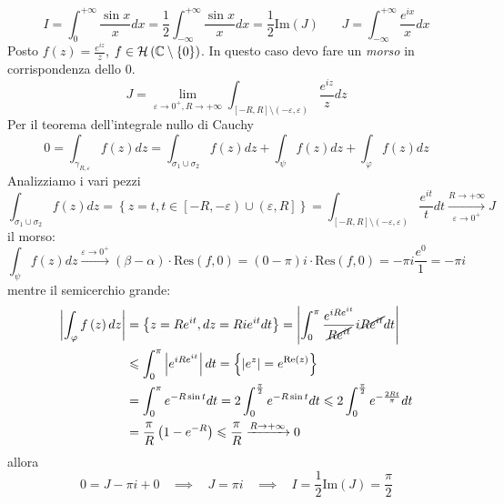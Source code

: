 \Soluzione
\begin{equation*}
I=\int ^{+\infty }_{0}\frac{\sin x}{x} dx=\frac{1}{2}\int ^{+\infty }_{-\infty }\frac{\sin x}{x} dx=\frac{1}{2}\mathrm{Im}\left( J\right) \ \ \ \ \ \ \ \ J=\int ^{+\infty }_{-\infty }\frac{e^{ix}}{x} dx
\end{equation*}
Posto $f\left( z\right) =\frac{e^{iz}}{z}$, $f\in \mathcal{H} \left(\mathbb{C} \setminus \left\{0\right\}\right)$. In questo caso devo fare un \textit{morso} in corrispondenza dello $0$.
\begin{equation*}
J=\lim _{\varepsilon \rightarrow 0^{+} ,R\rightarrow +\infty }\int _{\left[ -R,R\right] \setminus \left( -\varepsilon ,\varepsilon \right)}\frac{e^{iz}}{z} dz
\end{equation*}
Per il teorema dell'integrale nullo di Cauchy
\begin{equation*}
0=\int _{\gamma _{R,\varepsilon }} f\left( z\right) dz=\int _{\sigma _{1} \cup \sigma _{2}} f\left( z\right) dz+\int _{\psi } f\left( z\right) dz+\int _{\varphi } f\left( z\right) dz
\end{equation*}
Analizziamo i vari pezzi
\begin{equation*}
\int _{\sigma _{1} \cup \sigma _{2}} f\left( z\right) dz=\left\{z=t,t\in \left[ -R,-\varepsilon \right) \cup \left( \varepsilon ,R\right]\right\} =\int _{\left[ -R,R\right] \setminus \left( -\varepsilon ,\varepsilon \right)}\frac{e^{it}}{t} dt\xrightarrow[\varepsilon \rightarrow 0^{+}]{R\rightarrow +\infty } J
\end{equation*}
il morso:
\begin{equation*}
\int _{\psi } f\left( z\right) dz\xrightarrow{\varepsilon \rightarrow 0^{+}}\left( \beta -\alpha \right) \cdotp \mathrm{Res}\left( f,0\right) =\left( 0-\pi \right) i\cdotp \mathrm{Res}\left( f,0\right) =-\pi i\frac{e^{0}}{1} =-\pi i
\end{equation*}
mentre il semicerchio grande:
\begin{align*}
\left| \int _{\varphi } f\left( z\right) dz\right|  & =\left\{z=Re^{it} ,dz=Rie^{it} dt\right\} =\left| \int ^{\pi }_{0}\frac{e^{iRe^{it}}}{\cancel{Re^{it}}} i\cancel{Re^{it}} dt\right| \\
 & \leqslant \int ^{\pi }_{0}\left| e^{iRe^{it}}\right| dt=\left\{\left| e^{z}\right| =e^{\mathrm{Re}\left( z\right)}\right\}\\
 & =\int ^{\pi }_{0} e^{-R\sin t} dt=2\int ^{\frac{\pi }{2}}_{0} e^{-R\sin t} dt\leqslant 2\int ^{\frac{\pi }{2}}_{0} e^{-\frac{2Rt}{\pi }} dt\\
 & =\frac{\pi }{R}\left( 1-e^{-R}\right) \leqslant \frac{\pi }{R}\xrightarrow{R\rightarrow +\infty } 0
\end{align*}
allora
\begin{equation*}
0=J-\pi i+0\ \ \ \ \implies \ \ \ \ J=\pi i\ \ \ \ \implies \ \ \ \ I=\frac{1}{2}\mathrm{Im}\left( J\right) =\frac{\pi }{2}
\end{equation*}
\Soluzione

